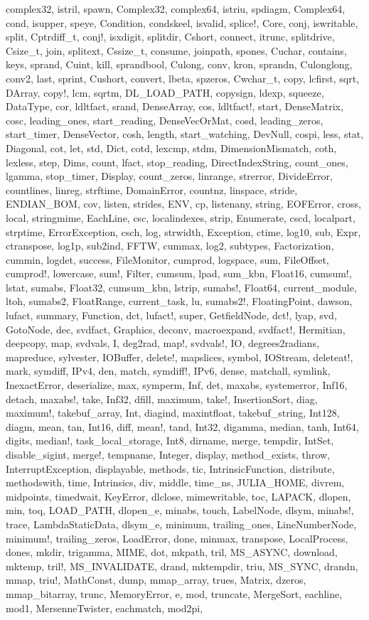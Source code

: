 complex32, istril, spawn, Complex32, complex64, istriu, spdiagm, Complex64, cond, isupper, speye, Condition, condskeel, isvalid, splice!, Core, conj, iswritable, split, Cptrdiff_t, conj!, isxdigit, splitdir, Cshort, connect, itrunc, splitdrive, Csize_t, join, splitext, Cssize_t, consume, joinpath, spones, Cuchar, contains, keys, sprand, Cuint, kill, sprandbool, Culong, conv, kron, sprandn, Culonglong, conv2, last, sprint, Cushort, convert, lbeta, spzeros, Cwchar_t, copy, lcfirst, sqrt, DArray, copy!, lcm, sqrtm, DL_LOAD_PATH, copysign, ldexp, squeeze, DataType, cor, ldltfact, srand, DenseArray, cos, ldltfact!, start, DenseMatrix, cosc, leading_ones, start_reading, DenseVecOrMat, cosd, leading_zeros, start_timer, DenseVector, cosh, length, start_watching, DevNull, cospi, less, stat, Diagonal, cot, let, std, Dict, cotd, lexcmp, stdm, DimensionMismatch, coth, lexless, step, Dims, count, lfact, stop_reading, DirectIndexString, count_ones, lgamma, stop_timer, Display, count_zeros, linrange, strerror, DivideError, countlines, linreg, strftime, DomainError, countnz, linspace, stride, ENDIAN_BOM, cov, listen, strides, ENV, cp, listenany, string, EOFError, cross, local, stringmime, EachLine, csc, localindexes, strip, Enumerate, cscd, localpart, strptime, ErrorException, csch, log, strwidth, Exception, ctime, log10, sub, Expr, ctranspose, log1p, sub2ind, FFTW, cummax, log2, subtypes, Factorization, cummin, logdet, success, FileMonitor, cumprod, logspace, sum, FileOffset, cumprod!, lowercase, sum!, Filter, cumsum, lpad, sum_kbn, Float16, cumsum!, lstat, sumabs, Float32, cumsum_kbn, lstrip, sumabs!, Float64, current_module, ltoh, sumabs2, FloatRange, current_task, lu, sumabs2!, FloatingPoint, dawson, lufact, summary, Function, dct, lufact!, super, GetfieldNode, dct!, lyap, svd, GotoNode, dec, svdfact, Graphics, deconv, macroexpand, svdfact!, Hermitian, deepcopy, map, svdvals, I, deg2rad, map!, svdvals!, IO, degrees2radians, mapreduce, sylvester, IOBuffer, delete!, mapslices, symbol, IOStream, deleteat!, mark, symdiff, IPv4, den, match, symdiff!, IPv6, dense, matchall, symlink, InexactError, deserialize, max, symperm, Inf, det, maxabs, systemerror, Inf16, detach, maxabs!, take, Inf32, dfill, maximum, take!, InsertionSort, diag, maximum!, takebuf_array, Int, diagind, maxintfloat, takebuf_string, Int128, diagm, mean, tan, Int16, diff, mean!, tand, Int32, digamma, median, tanh, Int64, digits, median!, task_local_storage, Int8, dirname, merge, tempdir, IntSet, disable_sigint, merge!, tempname, Integer, display, method_exists, throw, InterruptException, displayable, methods, tic, IntrinsicFunction, distribute, methodswith, time, Intrinsics, div, middle, time_ns, JULIA_HOME, divrem, midpoints, timedwait, KeyError, dlclose, mimewritable, toc, LAPACK, dlopen, min, toq, LOAD_PATH, dlopen_e, minabs, touch, LabelNode, dlsym, minabs!, trace, LambdaStaticData, dlsym_e, minimum, trailing_ones, LineNumberNode, minimum!, trailing_zeros, LoadError, done, minmax, transpose, LocalProcess, dones, mkdir, trigamma, MIME, dot, mkpath, tril, MS_ASYNC, download, mktemp, tril!, MS_INVALIDATE, drand, mktempdir, triu, MS_SYNC, drandn, mmap, triu!, MathConst, dump, mmap_array, trues, Matrix, dzeros, mmap_bitarray, trunc, MemoryError, e, mod, truncate, MergeSort, eachline, mod1, MersenneTwister, eachmatch, mod2pi, 